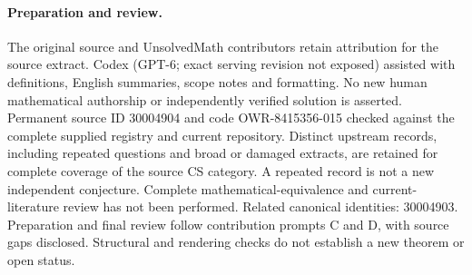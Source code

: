 \documentclass[11pt]{article}
\begin{document}
\paragraph{Preparation and review.}
The original source and UnsolvedMath contributors retain attribution for the source extract. Codex (GPT-6; exact serving revision not exposed) assisted with definitions, English summaries, scope notes and formatting. No new human mathematical authorship or independently verified solution is asserted. Permanent source ID 30004904 and code OWR-8415356-015 checked against the complete supplied registry and current repository. Distinct upstream records, including repeated questions and broad or damaged extracts, are retained for complete coverage of the source CS category. A repeated record is not a new independent conjecture. Complete mathematical-equivalence and current-literature review has not been performed. Related canonical identities: 30004903. Preparation and final review follow contribution prompts C and D, with source gaps disclosed. Structural and rendering checks do not establish a new theorem or open status.
\label{end:30004904}
\end{document}
